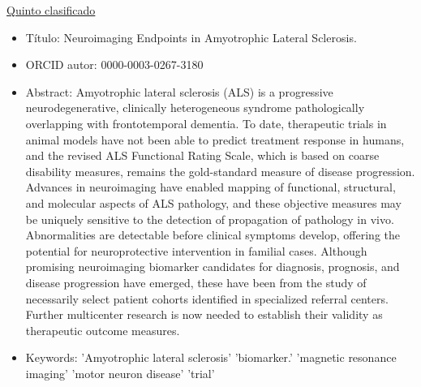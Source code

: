 \documentclass[size=a4, parskip=half, titlepage=false, toc=flat, toc=bib, 12pt, twoside]{scrartcl}
\theoremstyle{theorem-style}
\theoremstyle{definition-style}
\theoremstyle{remark-style}
\theoremstyle{example-style}
\theoremstyle{definition-style}
\theoremstyle{remark-style}
\begin{document}
\underline{Quinto clasificado}
\begin{itemize}
\item Título: Neuroimaging Endpoints in Amyotrophic Lateral Sclerosis.
\item ORCID autor: 0000-0003-0267-3180
\item Abstract: Amyotrophic lateral sclerosis (ALS) is a progressive neurodegenerative, clinically heterogeneous syndrome pathologically overlapping with frontotemporal dementia. To date, therapeutic trials in animal models have not been able to predict treatment response in humans, and the revised ALS Functional Rating Scale, which is based on coarse disability measures, remains the gold-standard measure of disease progression. Advances in neuroimaging have enabled mapping of functional, structural, and molecular aspects of ALS pathology, and these objective measures may be uniquely sensitive to the detection of propagation of pathology in vivo. Abnormalities are detectable before clinical symptoms develop, offering the potential for neuroprotective intervention in familial cases. Although promising neuroimaging biomarker candidates for diagnosis, prognosis, and disease progression have emerged, these have been from the study of necessarily select patient cohorts identified in specialized referral centers. Further multicenter research is now needed to establish their validity as therapeutic outcome measures.
\item Keywords: 'Amyotrophic lateral sclerosis' 'biomarker.'
  'magnetic resonance imaging' 'motor neuron disease' 'trial'
\end{itemize}
\end{document}
